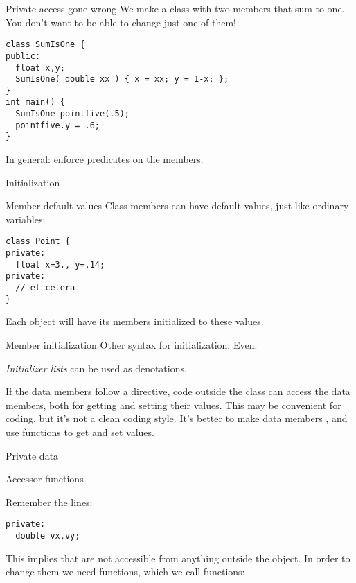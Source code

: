 \begin{block}{Private access gone wrong}
  \label{sl:privatenogood}
  We make a class with two members that sum to one.\\
  You don't want to be able to change just one of them!
\begin{verbatim}
class SumIsOne {
public: 
  float x,y;
  SumIsOne( double xx ) { x = xx; y = 1-x; };
}
int main() {
  SumIsOne pointfive(.5);
  pointfive.y = .6;
}
\end{verbatim}
In general: enforce predicates on the members.
\end{block}

 {Initialization}

\begin{block}{Member default values}
  \label{sl:class-defval}
  Class members can have default values, just like ordinary variables:
\begin{verbatim}
class Point {
private:
  float x=3., y=.14;
private:
  // et cetera
}
\end{verbatim}
  Each object will have its members initialized to these values.
\end{block}

\begin{block}{Member initialization}
  \label{sl:class-init}
  Other syntax for initialization:
  Even:

  \emph{Initializer lists} can be used as denotations.
\end{block}

If the data members follow a  directive, code
outside the class can access the data members, both for getting and
setting their values. This may be convenient for coding, but it's not
a clean coding style. It's better to make data members
, and use  functions to get
and set values.

\begin{block}{Private data}
  \label{sl:class-private}
\end{block}

 {Accessor functions}

Remember the lines:
\begin{verbatim}
private:
  double vx,vy;
\end{verbatim}
This implies that  are not accessible from anything outside
the object. In order to change them we need functions, which we call
 functions:

